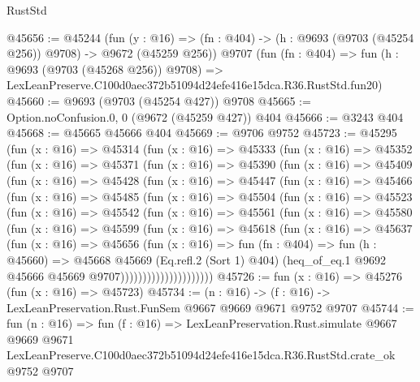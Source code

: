 \begin{lexlean}{RustStd}
\begin{coremodule}
@45656 := @45244
    (fun (y : @16) => (fn : @404) -> (h : @9693 (@9703 (@45254 @256)) @9708) -> @9672 (@45259 @256))
    @9707
    (fun (fn : @404) =>
    fun (h : @9693 (@9703 (@45268 @256)) @9708) =>
    LexLeanPreserve.C100d0aec372b51094d24efe416e15dca.R36.RustStd.fun20)
@45660 := @9693 (@9703 (@45254 @427)) @9708
@45665 := Option.noConfusion.{0, 0} (@9672 (@45259 @427)) @404
@45666 := @3243 @404
@45668 := @45665 @45666 @404
@45669 := @9706 @9752
@45723 := @45295
    (fun (x : @16) =>
    @45314
      (fun (x : @16) =>
      @45333
        (fun (x : @16) =>
        @45352
          (fun (x : @16) =>
          @45371
            (fun (x : @16) =>
            @45390
              (fun (x : @16) =>
              @45409
                (fun (x : @16) =>
                @45428
                  (fun (x : @16) =>
                  @45447
                    (fun (x : @16) =>
                    @45466
                      (fun (x : @16) =>
                      @45485
                        (fun (x : @16) =>
                        @45504
                          (fun (x : @16) =>
                          @45523
                            (fun (x : @16) =>
                            @45542
                              (fun (x : @16) =>
                              @45561
                                (fun (x : @16) =>
                                @45580
                                  (fun (x : @16) =>
                                  @45599
                                    (fun (x : @16) =>
                                    @45618
                                      (fun (x : @16) =>
                                      @45637
                                        (fun (x : @16) =>
                                        @45656
                                          (fun (x : @16) =>
                                          fun (fn : @404) =>
                                          fun (h : @45660) =>
                                          @45668
                                            @45669
                                            (Eq.refl.{2} (Sort 1) @404)
                                            (heq_of_eq.{1}
                                              @9692
                                              @45666
                                              @45669
                                              @9707)))))))))))))))))))))
@45726 := fun (x : @16) => @45276 (fun (x : @16) => @45723)
@45734 := (n : @16) -> (f : @16) -> LexLeanPreservation.Rust.FunSem @9667 @9669 @9671 @9752 @9707
@45744 := fun (n : @16) =>
  fun (f : @16) =>
  LexLeanPreservation.Rust.simulate
    @9667
    @9669
    @9671
    LexLeanPreserve.C100d0aec372b51094d24efe416e15dca.R36.RustStd.crate_ok
    @9752
    @9707
\end{coremodule}
\end{lexlean}
